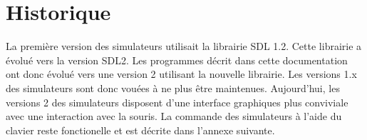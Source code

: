%

\section{Historique}
%
La première version des simulateurs utilisait la librairie SDL 1.2. Cette librairie a évolué vers la version SDL2. Les programmes décrit dans cette documentation ont donc évolué vers une version 2 utilisant la nouvelle librairie. Les versions 1.x des simulateurs sont donc vouées à ne plus être maintenues. Aujourd'hui, les versions 2 des simulateurs disposent d'une interface graphiques plus conviviale avec une interaction avec la souris. La commande des simulateurs à l'aide du clavier reste fonctionelle et est décrite dans l'annexe suivante.

